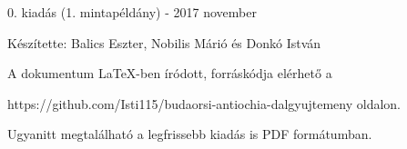 \documentclass[a5paper,twoside]{article}
\renewcommand{\_}[1]{\underline{#1}} %
\begin{document}
  \renewcommand{\thesongnum}{K\arabic{songnum}}
  \begin{songs}{}
    
  \end{songs}

  \renewcommand{\thesongnum}{M\arabic{songnum}}
  \setlength{\songnumwidth}{1.25cm}
  \begin{songs}{}
    
  \end{songs}

  \newpage
  \thispagestyle{empty}

  \vspace*{\fill}
  0. kiadás (1. mintapéldány) - 2017 november

  \vspace{0.3cm}

  Készítette: Balics Eszter, Nobilis Márió és Donkó István

  \vspace{0.3cm}

  A dokumentum LaTeX-ben íródott, forráskódja elérhető a

  https://github.com/Isti115/budaorsi-antiochia-dalgyujtemeny oldalon.

  Ugyanitt megtalálható a legfrissebb kiadás is PDF formátumban.
\end{document}
